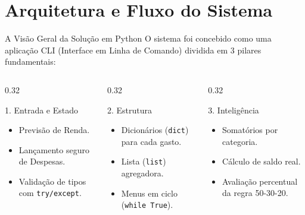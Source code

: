 \documentclass[10pt]{beamer}
\begin{document}
\section{Arquitetura e Fluxo do Sistema}

\begin{frame}{A Visão Geral da Solução em Python}
    O sistema foi concebido como uma aplicação CLI (Interface em Linha de Comando) dividida em 3 pilares fundamentais:

    \vspace{0.4cm}
    \begin{columns}
        \begin{column}{0.32\textwidth}
            \begin{block}{1. Entrada e Estado}
                \begin{itemize}
                    \item Previsão de Renda.
                    \item Lançamento seguro de Despesas.
                    \item Validação de tipos com \texttt{try/except}.
                \end{itemize}
            \end{block}
        \end{column}

        \begin{column}{0.32\textwidth}
            \begin{block}{2. Estrutura}
                \begin{itemize}
                    \item Dicionários (\texttt{dict}) para cada gasto.
                    \item Lista (\texttt{list}) agregadora.
                    \item Menus em ciclo (\texttt{while True}).
                \end{itemize}
            \end{block}
        \end{column}

        \begin{column}{0.32\textwidth}
            \begin{block}{3. Inteligência}
                \begin{itemize}
                    \item Somatórios por categoria.
                    \item Cálculo de saldo real.
                    \item Avaliação percentual da regra 50-30-20.
                \end{itemize}
            \end{block}
        \end{column}
    \end{columns}
\end{frame}
\end{document}

